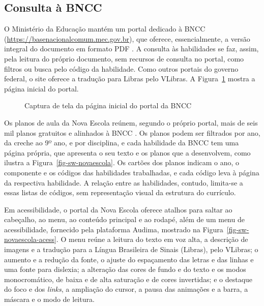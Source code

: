 \subsection{Consulta à BNCC}
\label{sec-referencial-softwares-consulta}

O Ministério da Educação mantém um portal dedicado à BNCC (\url{https://basenacionalcomum.mec.gov.br}), que oferece, essencialmente, a versão integral do documento em formato PDF \cite{brasil2018bncc}. A consulta às habilidades se faz, assim, pela leitura do próprio documento, sem recursos de consulta no portal, como filtros ou busca pelo código da habilidade. Como outros portais do governo federal, o site oferece a tradução para Libras pelo VLibras. A Figura~\ref{fig-sw-bncc} mostra a página inicial do portal.

\begin{figure}[H]
    \centering
    \caption{Captura de tela da página inicial do portal da BNCC}
    \label{fig-sw-bncc}
\end{figure}

Os planos de aula da Nova Escola reúnem, segundo o próprio portal, mais de seis mil planos gratuitos e alinhados à BNCC \cite{novaescola2026planos}. Os planos podem ser filtrados por ano, da creche ao 9º ano, e por disciplina, e cada habilidade da BNCC tem uma página própria, que apresenta o seu texto e os planos que a desenvolvem, como ilustra a Figura~\ref{fig-sw-novaescola}. Os cartões dos planos indicam o ano, o componente e os códigos das habilidades trabalhadas, e cada código leva à página da respectiva habilidade. A relação entre as habilidades, contudo, limita-se a essas listas de códigos, sem representação visual da estrutura do currículo.

Em acessibilidade, o portal da Nova Escola oferece atalhos para saltar ao cabeçalho, ao menu, ao conteúdo principal e ao rodapé, além de um menu de acessibilidade, fornecido pela plataforma Audima, mostrado na Figura~\ref{fig-sw-novaescola-acess}. O menu reúne a leitura do texto em voz alta, a descrição de imagens e a tradução para a Língua Brasileira de Sinais (Libras), pelo VLibras; o aumento e a redução da fonte, o ajuste do espaçamento das letras e das linhas e uma fonte para dislexia; a alteração das cores de fundo e do texto e os modos monocromático, de baixa e de alta saturação e de cores invertidas; e o destaque do foco e dos \textit{links}, a ampliação do cursor, a pausa das animações e a barra, a máscara e o modo de leitura.

